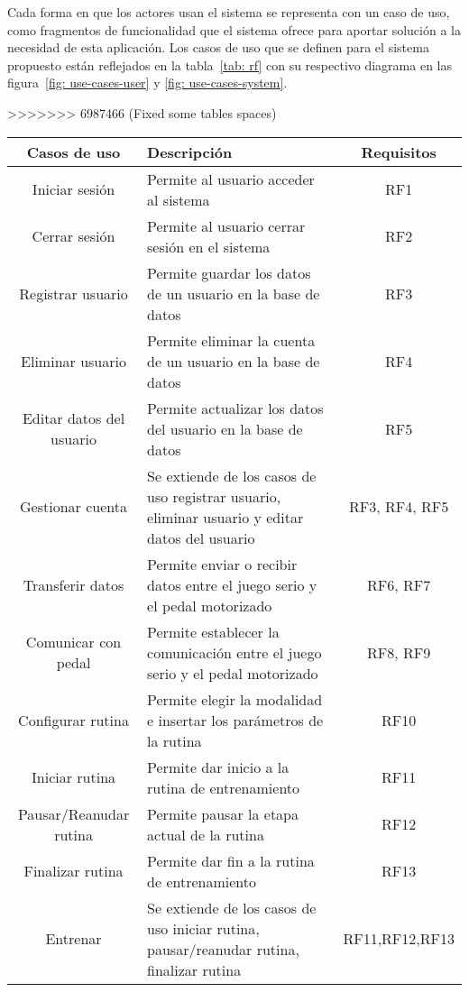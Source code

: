 Cada forma en que los actores usan el sistema se representa con un caso de uso, como fragmentos de funcionalidad que el sistema ofrece para aportar solución a la necesidad de esta aplicación. Los casos de uso que se definen para el sistema propuesto están reflejados en la tabla~\ref{tab: rf} con su respectivo diagrama en las figura~\ref{fig: use-cases-user} y \ref{fig: use-cases-system}.
\begin{table}[!ht]
>>>>>>> 6987466 (Fixed some tables spaces)
    \centering
    \begin{tabularx}{\textwidth}{|c|X|c|}
        \hline
        \textbf{Casos de uso} & \textbf{Descripción} & \textbf{Requisitos}\\\hline
        Iniciar sesión & Permite al usuario acceder al sistema & RF1\\\hline
        Cerrar sesión & Permite al usuario cerrar sesión en el sistema & RF2\\\hline
        Registrar usuario & Permite guardar los datos de un usuario en la base de datos & RF3\\\hline
        Eliminar usuario & Permite eliminar la cuenta de un usuario en la base de datos & RF4\\\hline
        Editar datos del usuario & Permite actualizar los datos del usuario en la base de datos & RF5\\\hline
        Gestionar cuenta  & Se extiende de los casos de uso registrar usuario, eliminar usuario y editar datos del usuario & RF3, RF4, RF5 \\\hline
        Transferir datos & Permite enviar o recibir datos entre el juego serio y el pedal motorizado & RF6, RF7\\\hline
        Comunicar con pedal & Permite establecer la comunicación entre el juego serio y el pedal motorizado & RF8, RF9\\\hline
        Configurar rutina & Permite elegir la modalidad e insertar los parámetros de la rutina  & RF10\\\hline
        Iniciar rutina & Permite dar inicio a la rutina de entrenamiento & RF11\\\hline
        Pausar/Reanudar rutina & Permite pausar la etapa actual de la rutina & RF12\\\hline
        Finalizar rutina & Permite dar fin a la rutina de entrenamiento & RF13\\\hline
        Entrenar & Se extiende de los casos de uso  iniciar rutina, pausar/reanudar rutina, finalizar rutina&RF11,RF12,RF13\\\hline

\end{tabularx}
\end{table}
